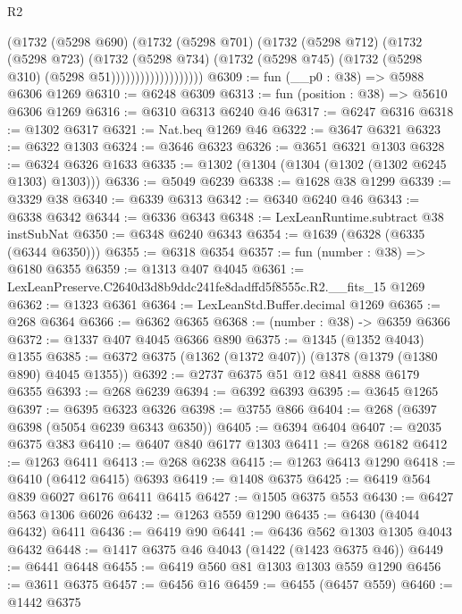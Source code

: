 \begin{lexlean}{R2}
\begin{coremodule}
                          (@1732
                            (@5298 @690)
                            (@1732
                              (@5298 @701)
                              (@1732
                                (@5298 @712)
                                (@1732
                                  (@5298 @723)
                                  (@1732
                                    (@5298 @734)
                                    (@1732
                                      (@5298 @745)
                                      (@1732 (@5298 @310) (@5298 @51)))))))))))))))))))
@6309 := fun (__p0 : @38) => @5988 @6306 @1269
@6310 := @6248 @6309
@6313 := fun (position : @38) => @5610 @6306 @1269
@6316 := @6310 @6313 @6240 @46
@6317 := @6247 @6316
@6318 := @1302 @6317
@6321 := Nat.beq @1269 @46
@6322 := @3647 @6321
@6323 := @6322 @1303
@6324 := @3646 @6323
@6326 := @3651 @6321 @1303
@6328 := @6324 @6326 @1633
@6335 := @1302 (@1304 (@1304 (@1302 (@1302 @6245 @1303) @1303)))
@6336 := @5049 @6239
@6338 := @1628 @38 @1299
@6339 := @3329 @38
@6340 := @6339 @6313
@6342 := @6340 @6240 @46
@6343 := @6338 @6342
@6344 := @6336 @6343
@6348 := LexLeanRuntime.subtract @38 instSubNat
@6350 := @6348 @6240 @6343
@6354 := @1639 (@6328 (@6335 (@6344 @6350)))
@6355 := @6318 @6354
@6357 := fun (number : @38) => @6180 @6355
@6359 := @1313 @407 @4045
@6361 := LexLeanPreserve.C2640d3d8b9ddc241fe8dadffd5f8555c.R2.__fits_15 @1269
@6362 := @1323 @6361
@6364 := LexLeanStd.Buffer.decimal @1269
@6365 := @268 @6364
@6366 := @6362 @6365
@6368 := (number : @38) -> @6359 @6366
@6372 := @1337 @407 @4045 @6366 @890
@6375 := @1345 (@1352 @4043) @1355
@6385 := @6372 @6375 (@1362 (@1372 @407)) (@1378 (@1379 (@1380 @890) @4045 @1355))
@6392 := @2737 @6375 @51 @12 @841 @888 @6179 @6355
@6393 := @268 @6239
@6394 := @6392 @6393
@6395 := @3645 @1265
@6397 := @6395 @6323 @6326
@6398 := @3755 @866
@6404 := @268 (@6397 @6398 (@5054 @6239 @6343 @6350))
@6405 := @6394 @6404
@6407 := @2035 @6375 @383
@6410 := @6407 @840 @6177 @1303
@6411 := @268 @6182
@6412 := @1263 @6411
@6413 := @268 @6238
@6415 := @1263 @6413 @1290
@6418 := @6410 (@6412 @6415) @6393
@6419 := @1408 @6375
@6425 := @6419 @564 @839 @6027 @6176 @6411 @6415
@6427 := @1505 @6375 @553
@6430 := @6427 @563 @1306 @6026
@6432 := @1263 @559 @1290
@6435 := @6430 (@4044 @6432) @6411
@6436 := @6419 @90
@6441 := @6436 @562 @1303 @1305 @4043 @6432
@6448 := @1417 @6375 @46 @4043 (@1422 (@1423 @6375 @46))
@6449 := @6441 @6448
@6455 := @6419 @560 @81 @1303 @1303 @559 @1290
@6456 := @3611 @6375
@6457 := @6456 @16
@6459 := @6455 (@6457 @559)
@6460 := @1442 @6375

\end{coremodule}
\end{lexlean}
